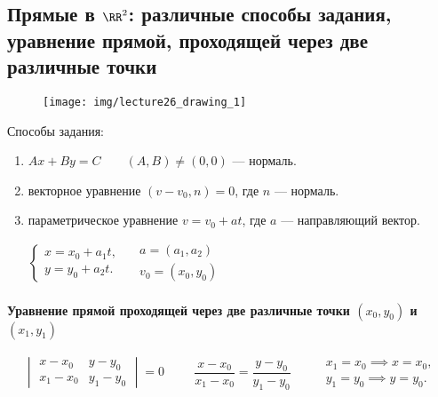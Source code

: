 \subsection{Прямые в $\RR^2$: различные способы задания, уравнение прямой, проходящей через две различные точки}

\begin{wrapfigure}{r}{5.5cm}
    \texttt{[image: img/lecture26\_drawing\_1]}
    \vspace{-110pt}
\end{wrapfigure}

Способы задания:
\begin{enumerate}
    \item $Ax + By = C \quad\quad (A, B) \neq (0, 0)$ --- нормаль.
    \item векторное уравнение $(v - v_0, n) = 0$, где $n$ --- нормаль.
    \item параметрическое уравнение $v = v_0 + at$, где $a$ --- направляющий вектор.

        \begin{math}
            \begin{cases}
                x = x_0 + a_1 t, \\
                y = y_0 + a_2 t.
            \end{cases} \quad
            \begin{gathered}
                a = (a_1, a_2) \\
                v_0 = (x_0, y_0)
            \end{gathered}
        \end{math}
\end{enumerate}

\paragraph{Уравнение прямой проходящей через две различные точки $(x_0, y_0)$ и $(x_1, y_1)$}

\begin{equation*}
    \begin{vmatrix} 
        x - x_0 & y - y_0 \\
        x_1 - x_0 & y_1 - y_0
    \end{vmatrix} = 0 \hspace{1cm}
    \frac{x - x_0}{x_1 - x_0} = \frac{y - y_0}{y_1 - y_0} \hspace{1cm}
    \begin{gathered}
        x_1 = x_0 \implies x = x_0, \\
        y_1 = y_0 \implies y = y_0.
    \end{gathered}
\end{equation*}



